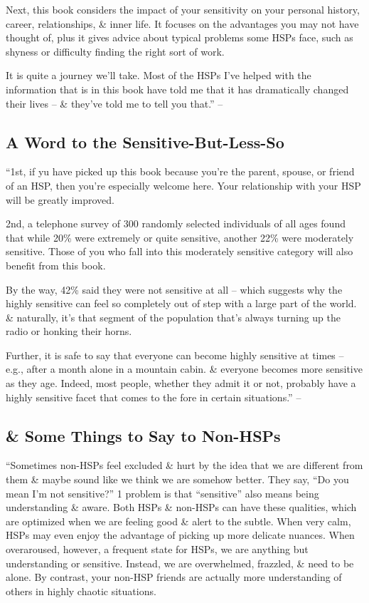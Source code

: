 \documentclass{article}
\numberwithin{equation}{section}
\begin{document}
Next, this book considers the impact of your sensitivity on your personal history, career, relationships, \& inner life. It focuses on the advantages you may not have thought of, plus it gives advice about typical problems some HSPs face, such as shyness or difficulty finding the right sort of work.

It is quite a journey we'll take. Most of the HSPs I've helped with the information that is in this book have told me that it has dramatically changed their lives -- \& they've told me to tell you that.'' -- \cite[p. 28]{Aron2013}

\subsection*{A Word to the Sensitive-But-Less-So}
``1st, if yu have picked up this book because you're the parent, spouse, or friend of an HSP, then you're especially welcome here. Your relationship with your HSP will be greatly improved.

2nd, a telephone survey of 300 randomly selected individuals of all ages found that while 20\% were extremely or quite sensitive, another 22\% were moderately sensitive. Those of you who fall into this moderately sensitive category will also benefit from this book.

By the way, 42\% said they were not sensitive at all -- which suggests why the highly sensitive can feel so completely out of step with a large part of the world. \& naturally, it's that segment of the population that's always turning up the radio or honking their horns.

Further, it is safe to say that everyone can become highly sensitive at times -- e.g., after a month alone in a mountain cabin. \& everyone becomes more sensitive as they age. Indeed, most people, whether they admit it or not, probably have a highly sensitive facet that comes to the fore in certain situations.'' -- \cite[p. 29]{Aron2013}

\subsection*{\& Some Things to Say to Non-HSPs}
``Sometimes non-HSPs feel excluded \& hurt by the idea that we are different from them \& maybe sound like we think we are somehow better. They say, ``Do you mean I'm not sensitive?'' 1 problem is that ``sensitive'' also means being understanding \& aware. Both HSPs \& non-HSPs can have these qualities, which are optimized when we are feeling good \& alert to the subtle. When very calm, HSPs may even enjoy the advantage of picking up more delicate nuances. When overaroused, however, a frequent state for HSPs, we are anything but understanding or sensitive. Instead, we are overwhelmed, frazzled, \& need to be alone. By contrast, your non-HSP friends are actually more understanding of others in highly chaotic situations.
\end{document}
